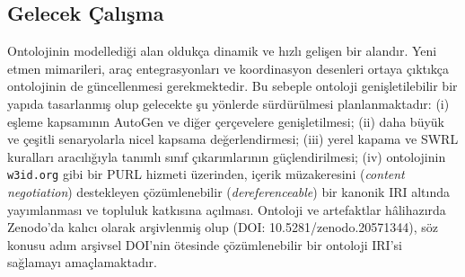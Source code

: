 \documentclass[10pt, a4paper, twocolumn]{article}
\begin{document}
\subsection{Gelecek Çalışma}

Ontolojinin modellediği alan oldukça dinamik ve hızlı gelişen bir alandır. Yeni etmen mimarileri, araç entegrasyonları ve koordinasyon desenleri ortaya çıktıkça ontolojinin de güncellenmesi gerekmektedir. Bu sebeple ontoloji genişletilebilir bir yapıda tasarlanmış olup gelecekte şu yönlerde sürdürülmesi planlanmaktadır: (i) eşleme kapsamının AutoGen ve diğer çerçevelere genişletilmesi; (ii) daha büyük ve çeşitli senaryolarla nicel kapsama değerlendirmesi; (iii) yerel kapama ve SWRL kuralları aracılığıyla tanımlı sınıf çıkarımlarının güçlendirilmesi; (iv) ontolojinin \texttt{w3id.org} gibi bir PURL hizmeti üzerinden, içerik müzakeresini (\textit{content negotiation}) destekleyen çözümlenebilir (\textit{dereferenceable}) bir kanonik IRI altında yayımlanması ve topluluk katkısına açılması. Ontoloji ve artefaktlar hâlihazırda Zenodo'da kalıcı olarak arşivlenmiş olup (DOI: 10.5281/zenodo.20571344), söz konusu adım arşivsel DOI'nin ötesinde çözümlenebilir bir ontoloji IRI'si sağlamayı amaçlamaktadır.
\end{document}
